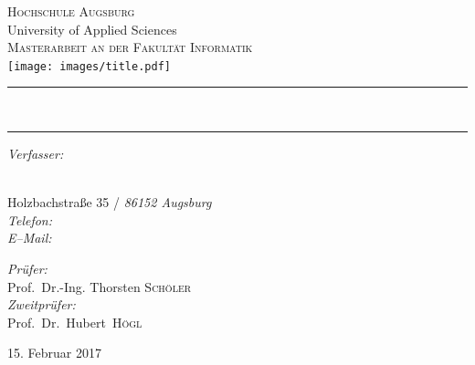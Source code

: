 \begin{titlepage}
\pagecolor{ThesisBackColor}
\begin{center}

\color{ThesisFontColor}
\textsc{\huge Hochschule Augsburg}\\[0.2cm]
\large University of Applied Sciences\\[1cm]
\textsc{\LARGE Masterarbeit an der Fakultät Informatik}\\[0.5cm]
\vspace{1em}
\texttt{[image: images/title.pdf]}~\\[1cm]


\rule{\linewidth}{0.5mm}

{\vspace{0.1cm}\Huge\bfseries \ThesisTitle\\[0.3cm]}
\rule{\linewidth}{0.5mm}

\vspace{0.5cm}

\noindent
\begin{minipage}[t]{0.4\textwidth}
\begin{flushleft} \large
\emph{Verfasser:}\\
\textnormal{\ThesisPreName~\textsc{\ThesisSurName}} \\
\vspace{1.2em}
\begin{singlespace}
  \normalsize
  \textnormal{Holzbachstraße 35} / \emph{86152 Augsburg} \\
  \emph{Telefon:} \texttt{\ThesisPhone} \\
  \emph{E--Mail:} \texttt{\ThesisMail}
\end{singlespace}
\end{flushleft}
\end{minipage}%
\begin{minipage}[t]{0.4\textwidth}
\begin{flushright} \large
\emph{Prüfer:} \\
\textnormal{Prof.\ Dr.-Ing. Thorsten \textsc{Schöler}} \\
\vspace{1em}
\emph{Zweitprüfer:} \\
\textnormal{Prof.\ Dr.\ Hubert\  \textsc{Högl}} \\
\end{flushright}
\end{minipage}

\vfill

{\large {15. Februar 2017}}
\end{center}
\end{titlepage}
\nopagecolor

